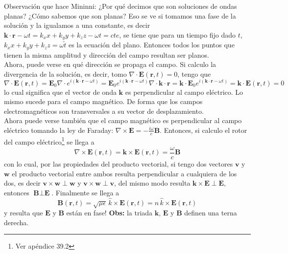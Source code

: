\indent Observación que hace Mininni: ¿Por qué decimos que son soluciones de ondas planas? ¿Cómo sabemos que son planas? Eso se ve si tomamos una fase de la solución y la igualamos a una constante, es decir $\textbf{k}\cdot \textbf{r} - \omega t = k_{x}x + k_{y}y + k_{z}z - \omega t = cte$, se tiene que para un tiempo fijo dado $t$, $k_{x}x + k_{y}y + k_{z}z = \omega \tilde{t}$ es la ecuación del plano. Entonces todos los puntos que tienen la misma amplitud y dirección del campo resultan ser planos.\\
\indent Ahora, puede verse en qué dirección se propaga el campo. Si calculo la divergencia de la solución, es decir, tomo $\nabla \cdot \textbf{E}(\textbf{r},t) = 0$, tengo que
\begin{equation*}
    \nabla \cdot \textbf{E}(\textbf{r},t)
    = \textbf{E}_{0}\nabla \cdot e^{i(\textbf{k}\cdot \textbf{r}-\omega t)}
    = \textbf{E}_{0}e^{i(\textbf{k}\cdot \textbf{r}-\omega t)} 
    \nabla \cdot \textbf{k}\cdot\textbf{r}
    = \textbf{k} \cdot \textbf{E}_{0}e^{i(\textbf{k}\cdot \textbf{r}-\omega t)} 
    = \textbf{k} \cdot \textbf{E}(\textbf{r},t) = 0
\end{equation*}
lo cual significa que el vector de onda $\textbf{k}$ es perpendicular al campo eléctrico. Lo mismo sucede para el campo magnético. De forma que los campos electromagnéticos son transversales a su vector de desplazamiento.\\
\indent Ahora puede verse también que el campo magnético es perpendicular al campo eléctrico tomando la ley de Faraday: $\nabla \times \textbf{E} = - \frac{i\omega}{c}\textbf{B}$. Entonces, si calculo el rotor del campo eléctrico\footnote{Ver apéndice 39.2} se llega a 
\begin{equation*}
    \nabla \times \textbf{E}(\textbf{r},t) =
    \textbf{k} \times \textbf{E}(\textbf{r},t) =
    \frac{\omega}{c}\textbf{B}
\end{equation*}
con lo cual, por las propiedades del producto vectorial, si tengo dos vectores $\textbf{v}$ y $\textbf{w}$ el producto vectorial entre ambos resulta perpendicular a cualquiera de los dos, es decir $\textbf{v}\times \textbf{w} \perp \textbf{w}$ y $\textbf{v}\times \textbf{w} \perp \textbf{v}$, del mismo modo resulta $\textbf{k}\times \textbf{E} \perp \textbf{E}$, entonces $\textbf{B} \perp \textbf{E}$. Finalmente se llega a 
\begin{equation*}
    \textbf{B}(\textbf{r},t) 
    = \sqrt{\mu \epsilon}\, \hat{k}\times \textbf{E}(\textbf{r},t)
    = n\, \hat{k} \times \textbf{E}(\textbf{r},t)
\end{equation*}
y resulta que $\textbf{E}$ y $\textbf{B}$ están en fase! \textbf{Obs:} la triada $\textbf{k}$, $\textbf{E}$ y $\textbf{B}$ definen una terna derecha. 

